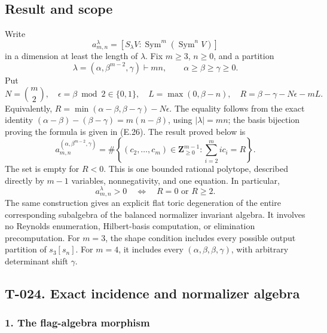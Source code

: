\documentclass[
  10pt,
]{article}
\begin{document}
\subsection{Result and scope}\label{result-and-scope}

Write \[
a_{m,n}^{\lambda}=[S_\lambda V:\operatorname{Sym}^m(\operatorname{Sym}^nV)]
\] in a dimension at least the length of \(\lambda\). Fix \(m\ge3\),
\(n\ge0\), and a partition \[
\lambda=(\alpha,\beta^{m-2},\gamma)\vdash mn,
\qquad \alpha\ge\beta\ge\gamma\ge0.
\] Put \[
N=\binom m2,\quad \epsilon=\beta\bmod2\in\{0,1\},\quad
L=\max(0,\beta-n),\quad
R=\beta-\gamma-N\epsilon-mL.
\tag{E.1}
\] Equivalently, \(R=\min(\alpha-\beta,\beta-\gamma)-N\epsilon\). The
equality follows from the exact identity
\((\alpha-\beta)-(\beta-\gamma)=m(n-\beta)\), using \(|\lambda|=mn\);
the basis bijection proving the formula is given in (E.26). The result
proved below is \[
\boxed{
a_{m,n}^{(\alpha,\beta^{m-2},\gamma)}
=\#\left\{(c_2,\ldots,c_m)\in\mathbf Z_{\ge0}^{m-1}:
\sum_{i=2}^m i c_i=R\right\}.}
\tag{E.2}
\] The set is empty for \(R<0\). This is one bounded rational polytope,
described directly by \(m-1\) variables, nonnegativity, and one
equation. In particular, \[
\boxed{a_{m,n}^{\lambda}>0\quad\Longleftrightarrow\quad R=0\text{ or }R\ge2.}
\tag{E.3}
\] The same construction gives an explicit flat toric degeneration of
the entire corresponding subalgebra of the balanced normalizer invariant
algebra. It involves no Reynolds enumeration, Hilbert-basis computation,
or elimination precomputation. For \(m=3\), the shape condition includes
every possible output partition of \(s_3[s_n]\). For \(m=4\), it
includes every \((\alpha,\beta,\beta,\gamma)\), with arbitrary
determinant shift \(\gamma\).

\subsection{T-024. Exact incidence and normalizer
algebra}\label{t-024.-exact-incidence-and-normalizer-algebra}

\subsubsection{1. The flag-algebra
morphism}\label{the-flag-algebra-morphism}
\end{document}

